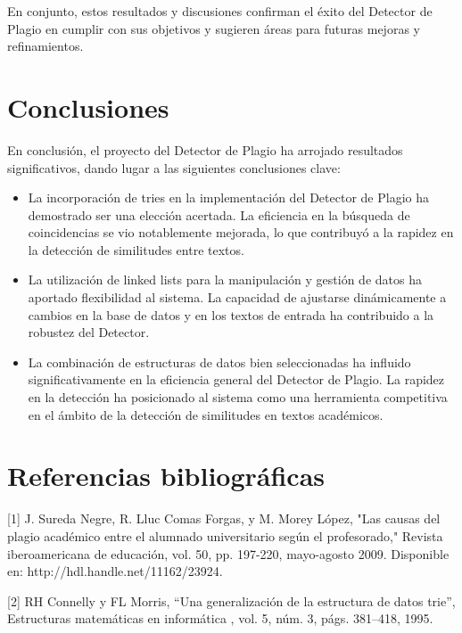 \documentclass[a4paper]{article}
\begin{document}
\begin{multicols}{2}
En conjunto, estos resultados y discusiones confirman el éxito del Detector de Plagio en cumplir con sus objetivos y sugieren áreas para futuras mejoras y refinamientos.

\section{Conclusiones}

En conclusión, el proyecto del Detector de Plagio ha arrojado resultados significativos, dando lugar a las siguientes conclusiones clave:

\begin{itemize}
    \item La incorporación de tries en la implementación del Detector de Plagio ha demostrado ser una elección acertada. La eficiencia en la búsqueda de coincidencias se vio notablemente mejorada, lo que contribuyó a la rapidez en la detección de similitudes entre textos.

    \item La utilización de linked lists para la manipulación y gestión de datos ha aportado flexibilidad al sistema. La capacidad de ajustarse dinámicamente a cambios en la base de datos y en los textos de entrada ha contribuido a la robustez del Detector.

    \item  La combinación de estructuras de datos bien seleccionadas ha influido significativamente en la eficiencia general del Detector de Plagio. La rapidez en la detección ha posicionado al sistema como una herramienta competitiva en el ámbito de la detección de similitudes en textos académicos.
\end{itemize}
 
\section{Referencias bibliográficas}

[1] J. Sureda Negre, R. Lluc Comas Forgas, y M. Morey López, "Las causas del plagio académico entre el alumnado universitario según el profesorado," Revista iberoamericana de educación, vol. 50, pp. 197-220, mayo-agosto 2009. Disponible en: http://hdl.handle.net/11162/23924.

[2] RH Connelly y FL Morris, “Una generalización de la estructura de datos trie”, Estructuras matemáticas en informática , vol. 5, núm. 3, págs. 381–418, 1995.

\end{multicols}
\end{document}
